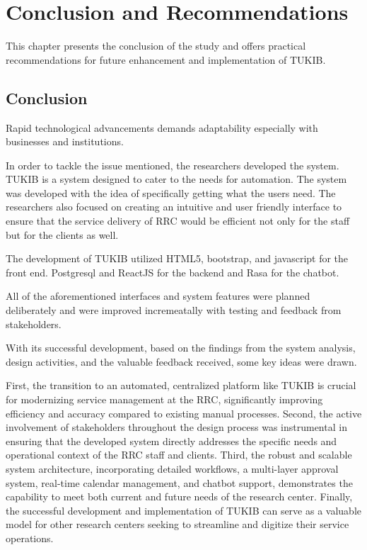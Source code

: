 \chapter{Conclusion and Recommendations}
This chapter presents the conclusion of the study and offers practical recommendations for future enhancement and implementation of TUKIB.

\section{Conclusion}
Rapid technological advancements demands adaptability especially with businesses and institutions. 

In order to tackle the issue mentioned, the researchers developed the system. TUKIB is a system designed to cater to the needs for automation. The system was developed with the idea of specifically getting what the users need. The researchers also focused on creating an intuitive and user friendly interface to ensure that the service delivery of RRC would be efficient not only for the staff but for the clients as well.

The development of TUKIB utilized HTML5, bootstrap, and javascript for the front end. Postgresql and ReactJS for the backend and Rasa for the chatbot. 

All of the aforementioned interfaces and system features were planned deliberately and were improved incremeatally with testing and feedback from stakeholders. 

With its successful development, based on the findings from the system analysis, design activities, and the valuable feedback received, some key ideas were drawn.

First, the transition to an automated, centralized platform like TUKIB is crucial for modernizing service management at the RRC, significantly improving efficiency and accuracy compared to existing manual processes. Second, the active involvement of stakeholders throughout the design process was instrumental in ensuring that the developed system directly addresses the specific needs and operational context of the RRC staff and clients. Third, the robust and scalable system architecture, incorporating detailed workflows, a multi-layer approval system, real-time calendar management, and chatbot support, demonstrates the capability to meet both current and future needs of the research center. Finally, the successful development and implementation of TUKIB can serve as a valuable model for other research centers seeking to streamline and digitize their service operations.


